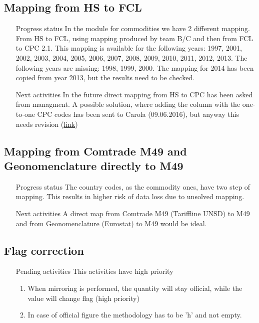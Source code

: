 \documentclass[nojss]{jss}\usepackage[]{graphicx}\usepackage[]{color}
\begin{document}
\subsection{Mapping from HS to FCL}
\begin{itemize}
\item[Progress status] In the module for commodities we have 2 different mapping. From HS to FCL, using mapping produced by team B/C and then from FCL to CPC 2.1. This mapping is available for the following years: 1997, 2001, 2002, 2003, 2004, 2005, 2006, 2007, 2008, 2009, 2010, 2011, 2012, 2013. The following years are missing: 1998, 1999, 2000. The mapping for 2014 has been copied from year 2013, but the results need to be checked.
\item[Next activities] In the future direct mapping from HS to CPC has been asked from managment. A possible solution, where adding the column with the one-to-one CPC codes has been sent to Carola (09.06.2016), but anyway this needs revision (\href{https://drive.google.com/drive/folders/0B_Z6srBtmyJRUmtaaXphTllZUDA}{link})
\end{itemize}

\subsection{Mapping from Comtrade M49 and Geonomenclature directly to M49}
\begin{itemize}
\item[Progress status] The country codes, as the commodity ones, have two step of mapping. This results in higher risk of data loss due to unsolved mapping.
\item[Next activities] A direct map from Comtrade M49 (Tariffline UNSD) to M49 and from Geonomenclature (Eurostat) to M49 would be ideal.
\end{itemize}

\subsection{Flag correction}
\begin{itemize}
\item[Pending activities] This activities have high priority
\begin{enumerate}
\item When mirroring is performed, the quantity will stay official, while the value will change flag (high priority)
\item In case of official figure the methodology has to be 'h' and not empty.
\end{enumerate}
\end{itemize}
\end{document}
